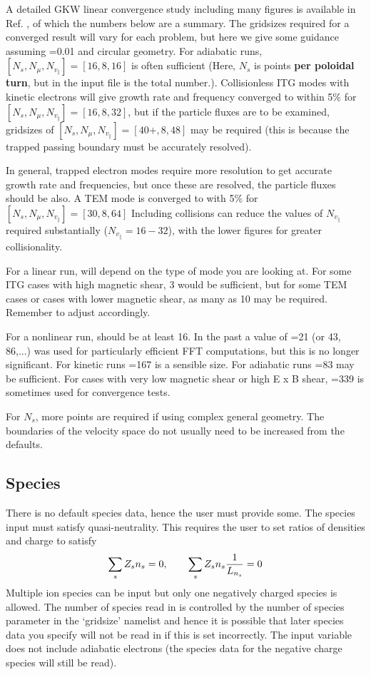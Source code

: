 A detailed GKW linear convergence study including many figures is available in Ref. \cite{VET10}, of which the numbers below are a summary.
The gridsizes required for a converged result will vary for each problem, but here we give some guidance assuming =0.01 and circular geometry.  For adiabatic runs, $[N_s,N_\mu,N_{v_\parallel}]=[16,8,16]$ is often sufficient (Here, $N_s$ is points \textbf{per poloidal turn}, but  in the input file is the total number.). 
Collisionless ITG modes with kinetic electrons will give growth rate and frequency converged to within 5\% for $[N_s,N_\mu,N_{v_\parallel}]=[16,8,32]$, 
but if the particle fluxes are to be examined, gridsizes of $[N_s,N_\mu,N_{v_\parallel}]=[40+,8,48]$ 
may be required (this is because the trapped passing boundary must be accurately resolved).  
 
In general, trapped electron modes require more resolution to get accurate growth rate and frequencies, 
but once these are resolved, the particle fluxes should be also.  A TEM mode is converged to with 5\%
for $[N_s,N_\mu,N_{v_\parallel}]=[30,8,64]$  Including collisions can reduce the values of $N_{v_\parallel}$ required 
substantially ($N_{v_\parallel} = 16-32$), with the lower figures for greater collisionality. 

For a linear run,  will depend on the type of mode you are looking at.  For some ITG cases with high magnetic shear, 
3 would be sufficient, but for some TEM cases or cases with lower magnetic shear, as many as 10 may be required.  Remember to adjust 
 accordingly.  

For a nonlinear run,  should be at least 16.  In the past a
value of =21 (or 43, 86,...) was used for particularly
efficient FFT computations, but this is no longer significant.  For
kinetic runs =167 is a sensible size.  For adiabatic runs
=83 may be sufficient.  For cases with very low magnetic
shear or high E x B shear, =339 is sometimes used for
convergence tests.

For $N_s$, more points are required if using complex general geometry.  
The boundaries of the velocity space do not usually need to be increased from the defaults. 

\subsection{Species}
There is no default species data, hence the user must provide some. The species input must satisfy quasi-neutrality. This requires the user to set ratios of densities and charge to satisfy
\begin{equation}
 \sum_s Z_s n_s =0, \qquad \sum_s Z_s n_s {1 \over L_{n_s}} = 0
\end{equation}
Multiple ion species can be input but only one negatively charged species is allowed.  The number of species read in is controlled by the number of species parameter in the `gridsize' namelist and
hence it is possible that later species data you specify will not be read in if this is set incorrectly.  The  input variable does not include adiabatic electrons (the
species data for the negative charge species will still be read).  

